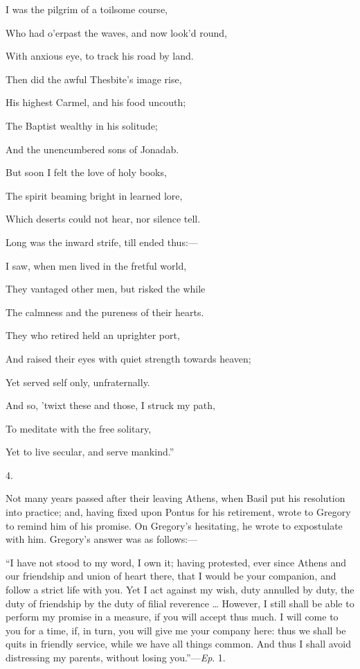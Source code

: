 I was the pilgrim of a toilsome course,

Who had o'erpast the waves, and now look'd round,

With anxious eye, to track his road by land.

Then did the awful Thesbite's image rise,

His highest Carmel, and his food uncouth;

The Baptist wealthy in his solitude;

And the unencumbered sons of Jonadab.

But soon I felt the love of holy books,

The spirit beaming bright in learned lore,

Which deserts could not hear, nor silence tell. 

Long was the inward strife, till ended thus:—

I saw, when men lived in the fretful world,

They vantaged other men, but risked the while

The calmness and the pureness of their hearts.

They who retired held an uprighter port,

And raised their eyes with quiet strength towards heaven;

Yet served self only, unfraternally.

And so, 'twixt these and those, I struck my path,

To meditate with the free solitary,

Yet to live secular, and serve mankind.''

4.

Not many years passed after their leaving Athens, when Basil put
his resolution into practice; and, having fixed upon Pontus for his
retirement, wrote to Gregory to remind him of his promise. On Gregory's
hesitating, he wrote to expostulate with him. Gregory's answer was as
follows:—

``I have not stood to my word, I own it; having protested, ever
since Athens and our friendship and union of heart there, that I would
be your companion, and follow a strict life with you. Yet I act
against my wish, duty annulled by duty, the duty of friendship by the
duty of filial reverence … However, I still shall be able to perform
my promise in a measure, if you will accept thus much. I will come to
you for a time, if, in turn, you will give me your company here: thus
we shall be quits in friendly service, while we have all things
common. And thus I shall avoid distressing my parents, without losing
you.''—\emph{Ep}. 1.

